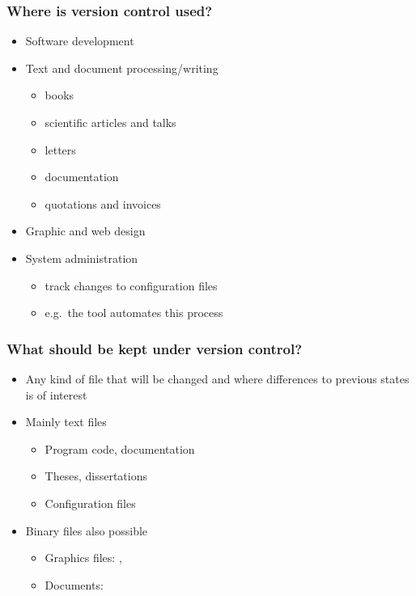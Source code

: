 \documentclass{git_course}
\begin{document}
\begin{frame}
\frametitle{Where is version control used?}
    \begin{itemize}
    \item Software development
    \item Text and document processing/writing
        \begin{itemize}
            \item books
            \item scientific articles and talks
            \item letters
            \item documentation
            \item quotations and invoices
        \end{itemize}
    \item Graphic and web design
    \item System administration
        \begin{itemize}
            \item track changes to configuration files
            \item e.g.\ the tool  automates this process
        \end{itemize}
    \end{itemize}
\end{frame}

\begin{frame}
\frametitle{What should be kept under version control?}
\begin{itemize}
    \item Any kind of file that will be changed and where differences to
        previous states is of interest
    \item Mainly text files
        \begin{itemize}
        \item Program code, documentation
        \item Theses, dissertations
        \item Configuration files
        \end{itemize}
    \item Binary files also possible
        \begin{itemize}
        \item Graphics files: , 
        \item Documents: 
        \end{itemize}
\end{itemize}
\end{frame}
\end{document}
